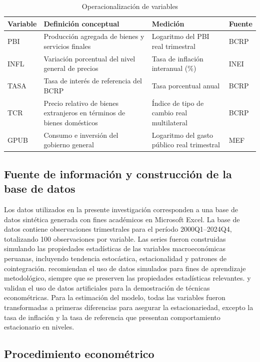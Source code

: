 \documentclass[12pt,a4paper]{article}
\begin{document}
\begin{table}[H]
\centering
\caption{Operacionalización de variables}
\label{tab:operacionalizacion}
\begin{tabular}{p{3cm}p{3.5cm}p{2.5cm}p{3.5cm}}
\toprule
\textbf{Variable} & \textbf{Definición conceptual} & \textbf{Medición} & \textbf{Fuente}\\
\midrule
PBI & Producción agregada de bienes y servicios finales & Logaritmo del PBI real trimestral & BCRP\\
INFL & Variación porcentual del nivel general de precios & Tasa de inflación interanual (\%) & INEI\\
TASA & Tasa de interés de referencia del BCRP & Tasa porcentual anual & BCRP\\
TCR & Precio relativo de bienes extranjeros en términos de bienes domésticos & Índice de tipo de cambio real multilateral & BCRP\\
GPUB & Consumo e inversión del gobierno general & Logaritmo del gasto público real trimestral & MEF\\
\bottomrule
\end{tabular}
\end{table}

\subsection{Fuente de información y construcción de la base de datos}

Los datos utilizados en la presente investigación corresponden a una base de datos sintética generada con fines académicos en Microsoft Excel. La base de datos contiene observaciones trimestrales para el período 2000Q1--2024Q4, totalizando 100 observaciones por variable. Las series fueron construidas simulando las propiedades estadísticas de las variables macroeconómicas peruanas, incluyendo tendencia estocástica, estacionalidad y patrones de cointegración. \citet{littlepohl2015} recomiendan el uso de datos simulados para fines de aprendizaje metodológico, siempre que se preserven las propiedades estadísticas relevantes. \citet{hamilton1994} y \citet{enders2014} validan el uso de datos artificiales para la demostración de técnicas econométricas. Para la estimación del modelo, todas las variables fueron transformadas a primeras diferencias para asegurar la estacionariedad, excepto la tasa de inflación y la tasa de referencia que presentan comportamiento estacionario en niveles.

\subsection{Procedimiento econométrico}
\end{document}
